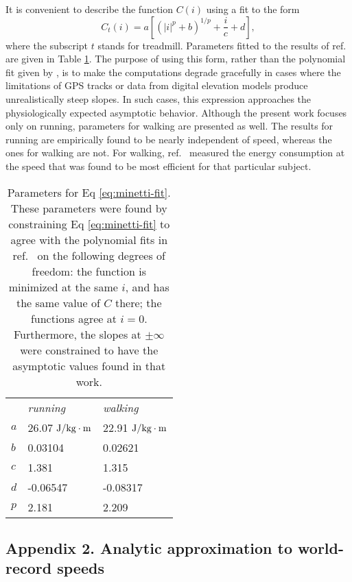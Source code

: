 \documentclass[10pt,letterpaper]{article}
\begin{document}
It is convenient to describe the function $C(i)$ using a fit to the form
\begin{equation}\label{eq:minetti-fit}
  C_t(i) = a\left[(|i|^p+b)^{1/p}+\frac{i}{c}+d\right],
\end{equation}
where the subscript $t$ stands for treadmill.
Parameters fitted to the results of ref.~\cite{minetti} are given in Table \ref{table:minetti-params}.
The purpose of using this form, rather than the polynomial fit given by \cite{minetti}, is
to make the computations degrade gracefully in cases where the limitations of GPS tracks or data from digital elevation models
produce unrealistically steep slopes. In such cases, this expression approaches the physiologically
expected asymptotic behavior. Although the present work focuses only on running, parameters for walking
are presented as well. The results for running are empirically found to be nearly independent of speed,
whereas the ones for walking are not. For walking, ref.~\cite{minetti} measured the energy consumption
at the speed that was found to be most efficient for that
particular subject.

\begin{table}[h]
\caption{Parameters for Eq \eqref{eq:minetti-fit}. These parameters were found by constraining
Eq \ref{eq:minetti-fit} to agree with the polynomial fits in ref.~\cite{minetti} on the following
degrees of freedom: the function is minimized at the same $i$, and has the same value of $C$ there;
the functions agree at $i=0$. Furthermore, the slopes at $\pm\infty$ were constrained to have the asymptotic values
found in that work.}
\begin{tabular}{lll}
   & \emph{running} & \emph{walking} \\
$a$  & 26.07 $\textup{J}/\textup{kg}\cdot\textup{m}$ & 22.91 $\textup{J}/\textup{kg}\cdot\textup{m}$ \\
$b$  & 0.03104 & 0.02621 \\
$c$ & 1.381 & 1.315 \\
$d$ & -0.06547 & -0.08317 \\
$p$ & 2.181 & 2.209
\end{tabular}
\label{table:minetti-params}
\end{table}

\subsection*{Appendix 2. Analytic approximation to world-record speeds}
\end{document}
